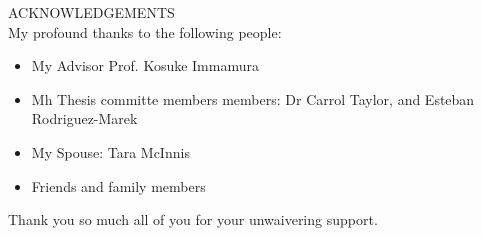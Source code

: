 ACKNOWLEDGEMENTS\\

My profound thanks to the following people:
\begin{itemize}
    \item My Advisor Prof. Kosuke Immamura
    \item Mh Thesis committe members members: Dr Carrol Taylor, and Esteban Rodriguez-Marek
    \item My Spouse: Tara McInnis
    \item Friends and family members
\end{itemize}

Thank you so much all of you for your unwaivering support.

\newpage
